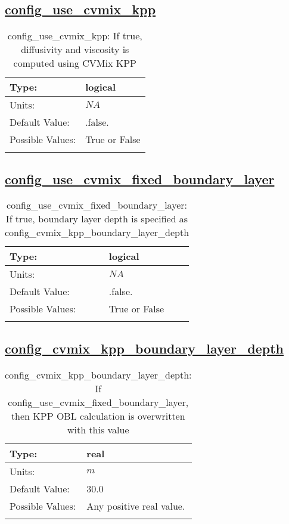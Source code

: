 \subsection[config\_use\_cvmix\_kpp]{\hyperref[sec:nm_tab_cvmix]{config\_use\_cvmix\_kpp}}
\label{subsec:nm_sec_config_use_cvmix_kpp}
\begin{center}
\begin{longtable}{| p{2.0in} || p{4.0in} |}
    \hline
    Type: & logical \\
    \hline
    Units: & $NA$ \\
    \hline
    Default Value: & .false. \\
    \hline
    Possible Values: & True or False \\
    \hline
    \caption{config\_use\_cvmix\_kpp: If true, diffusivity and viscosity is computed using CVMix KPP}
\end{longtable}
\end{center}
\subsection[config\_use\_cvmix\_fixed\_boundary\_layer]{\hyperref[sec:nm_tab_cvmix]{config\_use\_cvmix\_fixed\_boundary\_layer}}
\label{subsec:nm_sec_config_use_cvmix_fixed_boundary_layer}
\begin{center}
\begin{longtable}{| p{2.0in} || p{4.0in} |}
    \hline
    Type: & logical \\
    \hline
    Units: & $NA$ \\
    \hline
    Default Value: & .false. \\
    \hline
    Possible Values: & True or False \\
    \hline
    \caption{config\_use\_cvmix\_fixed\_boundary\_layer: If true, boundary layer depth is specified as config\_cvmix\_kpp\_boundary\_layer\_depth}
\end{longtable}
\end{center}
\subsection[config\_cvmix\_kpp\_boundary\_layer\_depth]{\hyperref[sec:nm_tab_cvmix]{config\_cvmix\_kpp\_boundary\_layer\_depth}}
\label{subsec:nm_sec_config_cvmix_kpp_boundary_layer_depth}
\begin{center}
\begin{longtable}{| p{2.0in} || p{4.0in} |}
    \hline
    Type: & real \\
    \hline
    Units: & $m$ \\
    \hline
    Default Value: & 30.0 \\
    \hline
    Possible Values: & Any positive real value. \\
    \hline
    \caption{config\_cvmix\_kpp\_boundary\_layer\_depth: If config\_use\_cvmix\_fixed\_boundary\_layer, then KPP OBL calculation is overwritten with this value}
\end{longtable}
\end{center}
